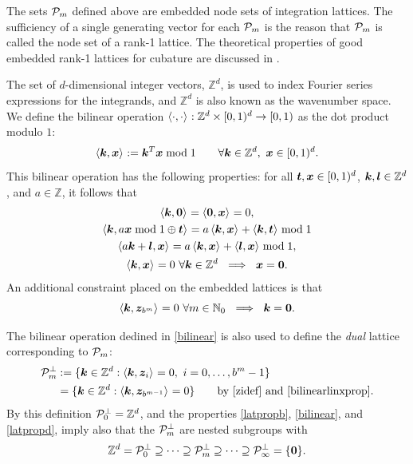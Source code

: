 \documentclass[graybox]{svmult}
\newcommand{\Z}{\mathbb{Z}} %
\newcommand{\N}{\mathbb{N}} %
\newcommand{\bszero}{\boldsymbol{0}} %
\newcommand{\bst}{\boldsymbol{t}}    %
\newcommand{\bsx}{\boldsymbol{x}}    %
\newcommand{\bsz}{\boldsymbol{z}}    %
\begin{document}
The sets $\mathcal{P}_m$ defined above are embedded node sets of integration lattices. The sufficiency of a single generating vector for each $\mathcal{P}_m$ is the reason that $\mathcal{P}_m$ is called the node set of a rank-1 lattice. 
The theoretical properties of good embedded rank-1 lattices for cubature are discussed in \cite{HicNie03a}.  
 
The set of $d$-dimensional integer vectors, $\Z^d$, is used to index Fourier series expressions for the integrands, and $\Z^d$ is also known as the wavenumber space. We define the bilinear operation $\ip{\cdot}{\cdot}: \Z^d \times \cube \to [0,1)$ as the dot product modulo $1$: 
\begin{equation}\label{bilinear}
\ip{\bsk}{\bsx}:=\bsk^T\bsx\bmod 1 \qquad \forall \bsk \in \Z^d, \ \bsx \in \cube.
\end{equation}
This bilinear operation has the following properties: for all $\bst, \bsx \in \cube$, $\bsk, \bsl \in \Z^d$, and $a \in \Z$, it follows that
\begin{subequations}
\begin{gather}
\ip{\bsk}{\bszero} = \ip{\bszero}{\bsx} = 0,\\
\ip{\bsk}{a \bsx \bmod 1 \oplus \bst} = a\ip{\bsk}{\bsx} + \ip{\bsk}{\bst} \bmod 1 \label{bilinearlinxprop} \\
\ip{a \bsk + \bsl}{\bsx} = a\ip{\bsk}{\bsx} + \ip{\bsl}{\bsx} \bmod 1, \label{bilinearlinkprop}\\
\ip{\bsk}{\bsx} = 0 \ \forall \bsk \in \Z^d \ \implies \ \bsx=\bszero.\label{bilinearlinzeroprop}
\end{gather}
\end{subequations}
An additional constraint placed on the embedded lattices is that
\begin{equation}
\ip{\bsk}{\bsz_{b^m}} =  0 \ \forall m \in \N_0   \ \implies \ \bsk=\bszero. \label{latpropd}
\end{equation}

The bilinear operation dedined in \eqref{bilinear} is also used to define the \emph{dual} lattice corresponding to $\mathcal{P}_m$:
\begin{align}
\nonumber
\cp^{\perp}_m & := \{\bsk \in \Z^d : \ip{\bsk}{\bsz_i} = 0, \ i=0, \ldots, b^m-1\} \\
&= \{\bsk \in \Z^d : \ip{\bsk}{\bsz_{b^{m-1}}} = 0 \} \qquad \text{by \eqref{zidef} and \eqref{bilinearlinxprop}} .\label{dualdef}
\end{align}
By this definition $\cp^{\perp}_{0}=\Z^d$, and the properties \eqref{latpropb}, \eqref{bilinear}, and \eqref{latpropd}, imply also that the $\mathcal{P}^{\perp}_m$ are nested subgroups with
\begin{equation}\label{dualemb}
\Z^d=\cp^{\perp}_{0}\supseteq\dots\supseteq\cp^{\perp}_{m}\supseteq\dots\supseteq\cp^{\perp}_{\infty}=\{\bszero\}.
\end{equation}
\end{document}
